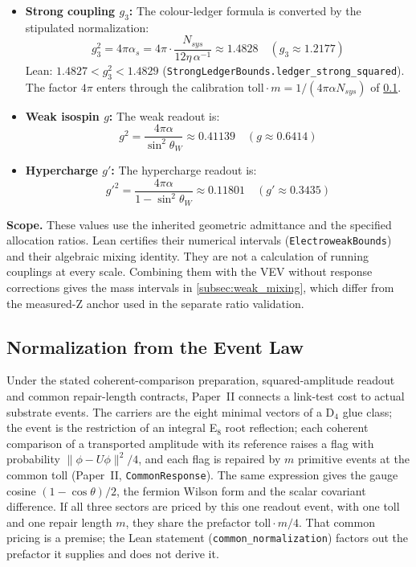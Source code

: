 \begin{itemize}
    \item \textbf{Strong coupling $g_3$:} The colour-ledger formula is converted by the stipulated normalization:
    \begin{equation}
        g_3^2 = 4\pi \alpha_s = 4\pi \cdot \frac{N_{sys}}{12\eta\,\alpha^{-1}}
        \approx 1.4828 \quad (g_3 \approx 1.2177)
    \end{equation}
    Lean: $1.4827<g_3^2<1.4829$ (\texttt{StrongLedgerBounds.ledger\_strong\_squared}).
    The factor $4\pi$ enters through the calibration $\mathrm{toll}\cdot m=1/(4\pi\alpha N_{sys})$ of \cref{subsec:event_normalization}.
    
    \item \textbf{Weak isospin $g$:} The weak readout is:
    \begin{equation}
        g^2 = \frac{4\pi\alpha}{\sin^2\theta_W} \approx 0.41139 \quad (g \approx 0.6414)
    \end{equation}
    
    \item \textbf{Hypercharge $g'$:} The hypercharge readout is:
    \begin{equation}
        g'^2 = \frac{4\pi\alpha}{1-\sin^2\theta_W} \approx 0.11801 \quad (g' \approx 0.3435)
    \end{equation}
\end{itemize}

\textbf{Scope.} These values use the inherited geometric admittance and the specified allocation ratios. Lean certifies their numerical intervals (\texttt{ElectroweakBounds}) and their algebraic mixing identity. They are not a calculation of running couplings at every scale. Combining them with the VEV without response corrections gives the mass intervals in \cref{subsec:weak_mixing}, which differ from the measured-Z anchor used in the separate ratio validation.

\subsection{Normalization from the Event Law}
\label{subsec:event_normalization}

Under the stated coherent-comparison preparation, squared-amplitude readout and common repair-length contracts, Paper~II connects a link-test cost to actual substrate events. The carriers are the eight minimal vectors of a D$_4$ glue class; the event is the restriction of an integral E$_8$ root reflection; each coherent comparison of a transported amplitude with its reference raises a flag with probability $\|\phi-U\phi\|^2/4$, and each flag is repaired by $m$ primitive events at the common toll (Paper~II, \texttt{CommonResponse}). The same expression gives the gauge cosine $(1-\cos\theta)/2$, the fermion Wilson form and the scalar covariant difference. If all three sectors are priced by this one readout event, with one toll and one repair length $m$, they share the prefactor $\mathrm{toll}\cdot m/4$. That common pricing is a premise; the Lean statement (\texttt{common\_normalization}) factors out the prefactor it supplies and does not derive it.

